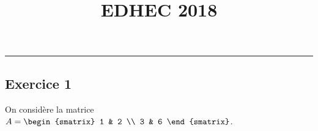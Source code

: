 \documentclass[11pt]{article}%
\title{\bf \vspace{-1.6cm} EDHEC 2018} %
\author{} %
\date{} %
\begin{document}
\maketitle %
\vspace{-1.2cm}\hrule %
\thispagestyle{fancy}

\vspace*{-.2cm}



\subsection*{Exercice 1}

\noindent
On considère la matrice $A =
\begin{smatrix}
  1 & 2 \\
  3 & 6
\end{smatrix}
$.
\end{document}
